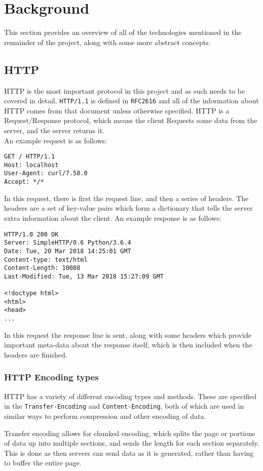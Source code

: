\section{Background}
This section provides an overview of all of the technologies mentioned in the remainder of the project, along with some more abstract concepts.
\subsection{HTTP}
HTTP is the most important protocol in this project and as such needs to be covered in detail.
\texttt{HTTP/1.1} is defined in \texttt{RFC2616}\cite{rfc2616} and all of the information about HTTP comes from that document unless otherwise specified.
HTTP is a Request/Response protocol, which means the client Requests some data from the server, and the server returns it.\\
An example request is as follows:
\begin{verbatim}
GET / HTTP/1.1
Host: localhost
User-Agent: curl/7.58.0
Accept: */*
\end{verbatim}
In this request, there is first the request line, and then a series of headers. The headers are a set of key-value pairs which form a dictionary that tells the server extra information about the client.\vspace{0.4cm}\newline
An example response is as follows:
\begin{verbatim}
HTTP/1.0 200 OK
Server: SimpleHTTP/0.6 Python/3.6.4
Date: Tue, 20 Mar 2018 14:25:01 GMT
Content-type: text/html
Content-Length: 10088
Last-Modified: Tue, 13 Mar 2018 15:27:09 GMT

<!doctype html>
<html>
<head>
...
\end{verbatim}
In this request the response line is sent, along with some headers which provide important meta-data about the response itself, which is then included when the headers are finished.

\subsubsection{HTTP Encoding types}
HTTP has a variety of different encoding types and methods.
These are specified in the \texttt{Transfer-Encoding} and \texttt{Content-Encoding}, both of which are  used in similar ways to perform compression and other encoding of data.\par
Transfer encoding allows for chunked encoding\cite{rfc7230}, which splits the page or portions of data up into multiple sections, and sends the length for each section separately. This is done as then servers can send data as it is generated, rather than having to buffer the entire page.

